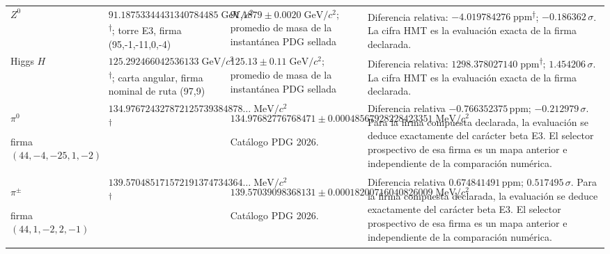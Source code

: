 \begin{longtable}{@{}>{\raggedright\arraybackslash}p{}>{\raggedright\arraybackslash}p{}>{\raggedright\arraybackslash}p{}>{\raggedright\arraybackslash}p{}@{}}
$Z^0$ & $91.187533\allowbreak{}444313\allowbreak{}407844\allowbreak{}85\;\mathrm{GeV}/c^2$\textsuperscript{\(\dagger\)}; torre E3, firma (95,-1,-11,0,-4) & $91.1879\pm0.0020\;\mathrm{GeV}/c^2$; promedio de masa de la instantánea PDG sellada & Diferencia relativa: $-4.019784\allowbreak{}276\;\mathrm{ppm}$\textsuperscript{\(\dagger\)}; $-0.186362\,\sigma$. La cifra HMT es la evaluación exacta de la firma declarada. \\
Higgs $H$ & $125.292466\allowbreak{}042536\allowbreak{}133\;\mathrm{GeV}/c^2$\textsuperscript{\(\dagger\)}; carta angular, firma nominal de ruta (97,9) & $125.13\pm0.11\;\mathrm{GeV}/c^2$; promedio de masa de la instantánea PDG sellada & Diferencia relativa: $1298.378027\allowbreak{}140\;\mathrm{ppm}$\textsuperscript{\(\dagger\)}; $1.454206\,\sigma$. La cifra HMT es la evaluación exacta de la firma declarada. \\
$\pi^0$\par firma $(44,\allowbreak -4,\allowbreak -25,\allowbreak 1,\allowbreak -2)$ & $134.976724\allowbreak{}327872\allowbreak{}125739\allowbreak{}384878\ldots\;\mathrm{MeV}/c^2$\textsuperscript{\(\dagger\)} & $134.976827\allowbreak{}767684\allowbreak{}71\pm 0.000485\allowbreak{}679282\allowbreak{}284233\allowbreak{}51\;\mathrm{MeV}/c^2$\par\footnotesize Catálogo PDG 2026. & Diferencia relativa $-0.766352\allowbreak{}375\,\mathrm{ppm}$; $-0.212979\,\sigma$. Para la firma compuesta declarada, la evaluación se deduce exactamente del carácter beta E3. El selector prospectivo de esa firma es un mapa anterior e independiente de la comparación numérica. \\
$\pi^\pm$\par firma $(44,\allowbreak 1,\allowbreak -2,\allowbreak 2,\allowbreak -1)$ & $139.570485\allowbreak{}171572\allowbreak{}191374\allowbreak{}734364\ldots\;\mathrm{MeV}/c^2$\textsuperscript{\(\dagger\)} & $139.570390\allowbreak{}983681\allowbreak{}31\pm 0.000182\allowbreak{}007160\allowbreak{}408260\allowbreak{}09\;\mathrm{MeV}/c^2$\par\footnotesize Catálogo PDG 2026. & Diferencia relativa $0.674841\allowbreak{}491\,\mathrm{ppm}$; $0.517495\,\sigma$. Para la firma compuesta declarada, la evaluación se deduce exactamente del carácter beta E3. El selector prospectivo de esa firma es un mapa anterior e independiente de la comparación numérica. \\

\end{longtable}

